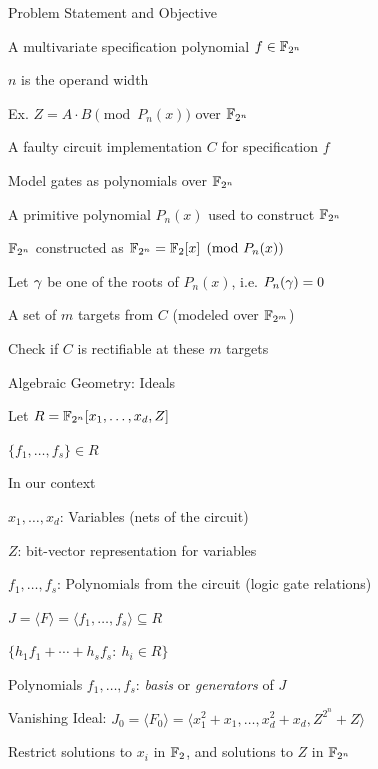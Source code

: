 \begin{frame}{\large Problem Statement and Objective}
\bi
	\item A multivariate specification polynomial $f \in {\mathbb{F}}_{2^n}$
	\bi
		\item $n$ is the operand width
		\item Ex. $Z = A \cdot B \pmod{P_n(x)}$ over ${\mathbb{F}}_{2^n}$
	\ei 
	\vspace{0.1in}
	\item A faulty circuit implementation $C$ for specification $f$ 
	\bi
		\item Model gates as polynomials over ${\mathbb{F}}_{2^n}$
	\ei
	\vspace{0.1in}
	\item A primitive polynomial $P_n(x)$ used to construct ${\mathbb{F}}_{2^n}$
	\bi
		\item ${\mathbb{F}}_{2^n}$ constructed as ${\mathbb{F}}_{2^n} = {\mathbb{F}}_2[x] \pmod{ P_n(x)}$
		\item Let $\gamma$ be one of the roots of $P_n(x)$, i.e. $P_n(\gamma) = 0$
	\ei
	\vspace{0.1in}
	\item A set of $m$ targets from $C$ (modeled over ${\mathbb{F}}_{2^m}$)
	\vspace{0.1in}
	\vspace{0.1in}
	\item Check if $C$ is rectifiable at these $m$ targets 


\ei
\end{frame}



\begin{frame}{\large Algebraic Geometry: Ideals}
\bi
	\item Let $R={\mathbb{F}}_{2^n}[x_1,\dots,x_d,Z]$
	\bi
		\item $\{f_1, \dots, f_s\} \in R$
	\ei
	\vspace{0.1in}
	\item In our context
	\bi
		\item $x_1,\dots,x_d$: Variables (nets of the circuit)
		\item $Z$: bit-vector representation for variables
		\item $f_1, \dots, f_s$: Polynomials from the circuit (logic gate relations)
	\ei
	\vspace{0.1in}
	\item $J = \langle F \rangle = \langle f_1, \dots, f_s \rangle \subseteq R$
	\bi
		\item $\{h_1f_1 + \cdots + h_sf_s:~h_i \in R\}$
		\item Polynomials $f_1, \dots, f_s$: {\it basis} or {\it generators} of $J$
	\ei
	\vspace{0.1in}
	\item Vanishing Ideal: $J_0 = \langle F_0 \rangle =  \langle x_1^2+x_1,\dots,x_d^2+x_d, Z^{2^n}+Z\rangle$
	\bi
		\item Restrict solutions to $x_i$ in ${\mathbb{F}}_2$, and solutions to $Z$ in ${\mathbb{F}}_{2^n}$
	\ei
\ei
\end{frame}

